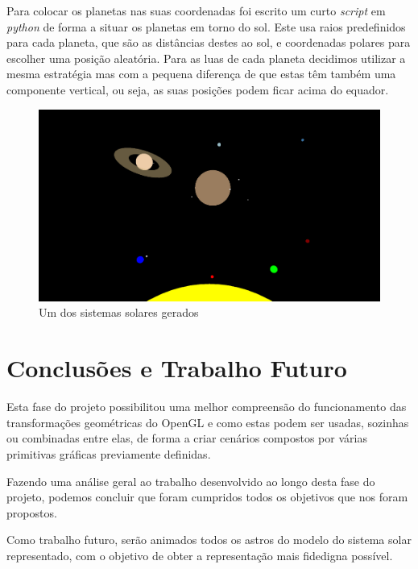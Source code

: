 \documentclass[a4paper]{article}
\begin{document}
Para colocar os planetas nas suas coordenadas foi escrito um curto \textit{script} em \textit{python} de forma a situar os planetas em torno do sol. Este usa raios predefinidos para cada planeta, que são as distâncias destes ao sol, e coordenadas polares para escolher uma posição aleatória.
Para as luas de cada planeta decidimos utilizar a mesma estratégia mas com a pequena diferença de que estas têm também uma componente vertical, ou seja, as suas posições podem ficar acima do equador.

\begin{figure}[H]
    \centering
    \includegraphics[width=\textwidth]{solar2.png}
    \caption{Um dos sistemas solares gerados}
\end{figure}

\section{Conclusões e Trabalho Futuro}
Esta fase do projeto possibilitou uma melhor compreensão do funcionamento das transformações geométricas do OpenGL e como estas podem ser usadas, sozinhas ou combinadas entre elas, de forma a criar cenários compostos por várias primitivas  gráficas previamente definidas.

Fazendo uma análise geral ao trabalho desenvolvido ao longo desta fase do projeto, podemos concluir que foram cumpridos todos os objetivos que nos foram propostos.

Como trabalho futuro, serão animados todos os astros do modelo do sistema solar representado, com o objetivo de obter a representação mais fidedigna possível.
\end{document}
